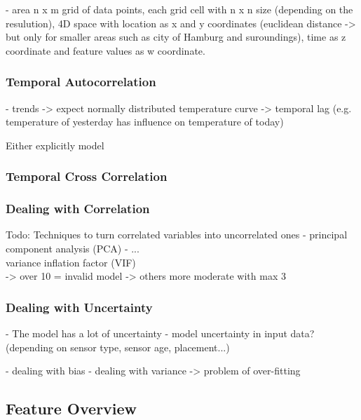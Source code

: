 - area n x m grid of data points, each grid cell with n x n size (depending on the resulution), 4D space with location as x and y coordinates (euclidean distance -> but only for smaller areas such as city of Hamburg and suroundings), time as z coordinate and feature values as w coordinate.\\

\subsubsection{Temporal Autocorrelation}

- trends
-> expect normally distributed temperature curve
-> temporal lag (e.g. temperature of yesterday has influence on temperature of today)

Either explicitly model 

\subsubsection{Temporal Cross Correlation}

\subsubsection{Dealing with Correlation}
\label{subsec:Dealing with Correlation}

Todo: Techniques to turn correlated variables into uncorrelated ones
- principal component analysis (PCA)
- ...\\

variance inflation factor (VIF)\\
-> over 10 = invalid model\cite{montgomery2021introduction}
-> others more moderate with max 3 \cite{zuur2010protocol}

\subsubsection{Dealing with Uncertainty}
- The model has a lot of uncertainty
- model uncertainty in input data? (depending on sensor type, sensor age, placement...)

- dealing with bias
- dealing with variance
-> problem of over-fitting

\subsection{Feature Overview}

